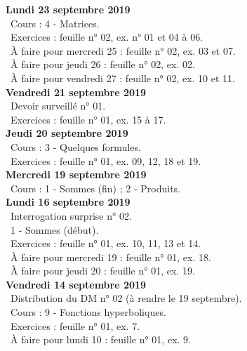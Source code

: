 \documentclass[12pt,a4paper]{article}
\begin{document}
 \noindent\textbf{\bf Lundi 23 septembre 2019}\\
 \bu\ Cours : 4 - Matrices.\\
 \bu\ Exercices : feuille n° 02, ex. n° 01 et 04 à 06.\\
 \bu\ À faire pour mercredi 25 : feuille n° 02, ex. 03 et 07.\\
 \bu\ À faire pour jeudi 26 : feuille n° 02, ex. 02.\\
 \bu\ À faire pour vendredi 27 : feuille n° 02, ex. 10 et 11.\vspace{.4cm}\\ 
 
 \noindent\textbf{Vendredi 21 septembre 2019}\\
 \bu\ Devoir surveillé n° 01.\\
 \bu\ Exercices : feuille n° 01, ex. 15 à 17.\vspace{.4cm}\\
  
 \noindent\textbf{Jeudi 20 septembre 2019}\\
 \bu\ Cours : 3 - Quelques formules.\\
 \bu\ Exercices : feuille n° 01, ex. 09, 12, 18 et 19.\vspace{.4cm}\\
 
 \noindent\textbf{\bf Mercredi 19 septembre 2019}\\
 \bu\ Cours : 1 - Sommes (fin) ; 2 - Produits.\vspace{.4cm}\\
 
 \noindent\textbf{\bf Lundi 16 septembre 2019}\\ 
 \bu\ Interrogation surprise n° 02.\\
 \bu\ 1 - Sommes (début).\\
 \bu\ Exercices : feuille n° 01, ex. 10, 11, 13 et 14.\\
 \bu\ À faire pour mercredi 19 : feuille n° 01, ex. 18.\\
 \bu\ À faire pour jeudi 20 : feuille n° 01, ex. 19.\vspace{.4cm}\\
 
 \noindent\textbf{Vendredi 14 septembre 2019}\\
 \bu\ Distribution du DM n° 02 (à rendre le 19 septembre).\\
 \bu\ Cours : 9 - Fonctions hyperboliques.\\
 \bu\ Exercices : feuille n° 01, ex. 7.\\
 \bu\ À faire pour lundi 10 : feuille n° 01, ex. 9.\vspace{.4cm}\\
 
\end{document}
